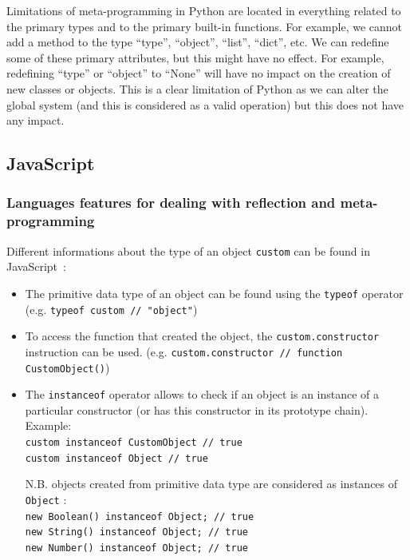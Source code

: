 \documentclass[a4paper,10pt]{article}
\begin{document}
Limitations of meta-programming in Python are located in everything related to the primary types and to the primary built-in functions.
For example, we cannot add a method to the type ``type'', ``object'', ``list'', ``dict'', etc.
We can redefine some of these primary attributes, but this might have no effect.
For example, redefining ``type'' or ``object'' to ``None'' will have no impact on the creation of new classes or objects.
This is a clear limitation of Python as we can alter the global system (and this is considered as a valid operation) but this does not have any impact.


\subsection{JavaScript}

\setjs
\subsubsection{Languages features for dealing with reflection and meta-programming}

Different informations about the type of an object \lstinline|custom| can be found in \mbox{JavaScript :}
\begin{itemize}
\item The primitive data type of an object can be found using the \lstinline|typeof| operator (e.g. \lstinline|typeof custom // "object"|)

\item To access the function that created the object, the \lstinline|custom.constructor| instruction can be used. (e.g. \lstinline|custom.constructor // function CustomObject()|)

\item The \lstinline|instanceof| operator allows to check if an object is an instance of a particular constructor (or has this constructor in its prototype chain). \\
		Example: \\
		\lstinline|custom instanceof CustomObject // true| \\
		\lstinline|custom instanceof Object // true|

		\smallskip
		N.B. objects created from primitive data type are considered as instances of \lstinline|Object| : \\
		\lstinline|new Boolean() instanceof Object; // true| \\
		\lstinline|new String() instanceof Object; // true| \\
		\lstinline|new Number() instanceof Object; // true| \\
\end{itemize}
\end{document}

